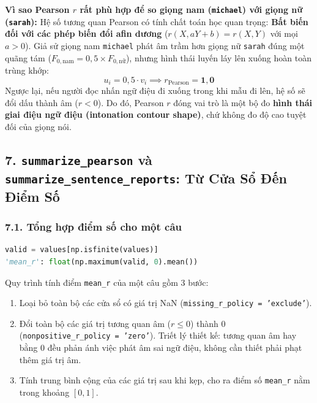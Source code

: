 \documentclass[11pt,a4paper]{article}
\begin{document}
\begin{physicalinsight}
\textbf{Vì sao Pearson $r$ rất phù hợp để so giọng nam (\texttt{michael}) với giọng nữ (\texttt{sarah}):}
Hệ số tương quan Pearson có tính chất toán học quan trọng: \textbf{Bất biến đối với các phép biến đổi afin dương} ($r(X, aY + b) = r(X, Y)$ với mọi $a > 0$). Giả sử giọng nam \texttt{michael} phát âm trầm hơn giọng nữ \texttt{sarah} đúng một quãng tám ($F_{0, \text{nam}} = 0{,}5 \times F_{0, \text{nữ}}$), nhưng hình thái luyến láy lên xuống hoàn toàn trùng khớp:
\[
u_i = 0{,}5 \cdot v_i \implies r_{\text{Pearson}} = \mathbf{1{,}0}
\]
Ngược lại, nếu người đọc nhấn ngữ điệu đi xuống trong khi mẫu đi lên, hệ số sẽ đổi dấu thành âm ($r < 0$). Do đó, Pearson $r$ đóng vai trò là một bộ đo \textbf{hình thái giai điệu ngữ điệu (intonation contour shape)}, chứ không đo độ cao tuyệt đối của giọng nói.
\end{physicalinsight}

\subsection*{7. \texttt{summarize\_pearson} và \texttt{summarize\_sentence\_reports}: Từ Cửa Sổ Đến Điểm Số}

\subsubsection*{7.1. Tổng hợp điểm số cho một câu}
\begin{lstlisting}[language=Python]
valid = values[np.isfinite(values)]
'mean_r': float(np.maximum(valid, 0).mean())
\end{lstlisting}
Quy trình tính điểm \texttt{mean\_r} của một câu gồm 3 bước:
\begin{enumerate}
    \setlength{\itemsep}{0.5pt}
    \item Loại bỏ toàn bộ các cửa sổ có giá trị NaN (\texttt{missing\_r\_policy = 'exclude'}).
    \item Đổi toàn bộ các giá trị tương quan âm ($r \le 0$) thành $0$ (\texttt{nonpositive\_r\_policy = 'zero'}). Triết lý thiết kế: tương quan âm hay bằng 0 đều phản ánh việc phát âm sai ngữ điệu, không cần thiết phải phạt thêm giá trị âm.
    \item Tính trung bình cộng của các giá trị sau khi kẹp, cho ra điểm số \texttt{mean\_r} nằm trong khoảng $[0, 1]$.
\end{enumerate}
\end{document}
